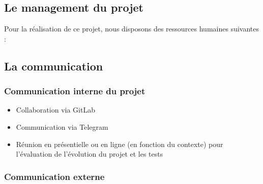 \subsection{Le management du projet}

Pour la réalisation de ce projet, nous disposons des ressources humaines suivantes :

\begin{table}[H]
	\centering
	\caption{Le management du projet}
	\label{tab:my-table}
\end{table}

\subsection{La communication}


\subsubsection{Communication interne du projet}

\begin{itemize}
	\item Collaboration via GitLab
	\item Communication via Telegram
	\item Réunion en présentielle ou en ligne (en fonction du contexte) pour l’évaluation de l’évolution du projet et les tests
\end{itemize}

\subsubsection{Communication externe}

